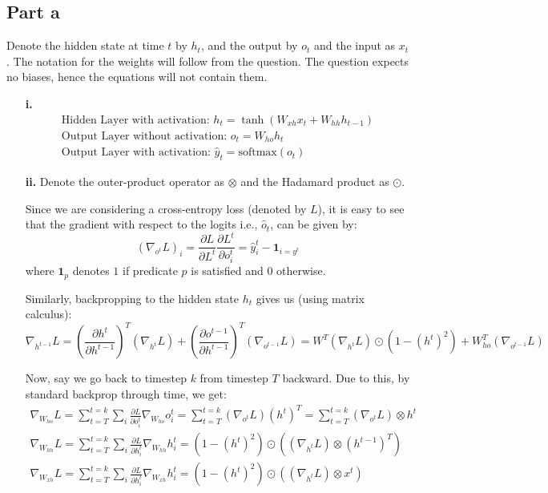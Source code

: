 \documentclass{article}
\newcommand{\Do}{\partial}
\newcommand{\G}{\nabla}
\begin{document}
\subsection*{Part a}
\begin{flushleft}
Denote the hidden state at time \(t\) by \(h_{t}\), and the output by \(o_{t}\) and the input as \(x_{t}\). The notation for the weights will follow from the question. The question expects no biases, hence the equations will not contain them.
\begin{itemize}
\item [\textbf{i.}]
\begin{gather}
\text{Hidden Layer with activation: }h_{t} = \tanh(W_{xh}x_{t} + W_{hh}h_{t-1}) \\
\text{Output Layer without activation: }o_{t} = W_{ho}h_{t} \\
\text{Output Layer with activation: }\hat{y}_{t} = \mathrm{softmax}(o_{t})
\end{gather}

\item [\textbf{ii.}]
Denote the outer-product operator as \(\otimes\) and the Hadamard product as \(\odot\).

Since we are considering a cross-entropy loss (denoted by \(L\)), it is easy to see that the gradient with respect to the logits i.e., \(\hat{o}_{t}\), can be given by:
\begin{equation}
\left(\G_{o^{t}} L\right)_{i} = \frac{\Do L}{\Do L^{t}} \frac{\Do L^{t}}{\Do o_{i}^{t}} = \hat{y}_{i}^{t} - \mathbf{1}_{i = y^{t}}
\end{equation}
where \(\mathbf{1}_{p}\) denotes \(1\) if predicate \(p\) is satisfied and \(0\) otherwise.

Similarly, backpropping to the hidden state \(h_{t}\) gives us (using matrix calculus):
\begin{equation}
\label{hidden}
\G_{h^{t - 1}} L = \left(\frac{\Do h^{t}}{\Do h^{t - 1}}\right)^{T} (\G_{h^{t}} L) + \left(\frac{\Do o^{t - 1}}{\Do h^{t - 1}}\right)^{T} (\G_{o^{t - 1}} L) = W^{T} (\G_{h^{t}} L) \odot (1 - (h^{t})^{2}) + W_{ho}^{T} (\G_{o^{t - 1}} L)
\end{equation}

Now, say we go back to timestep \(k\) from timestep \(T\) backward. Due to this, by standard backprop through time, we get:
\begin{gather}
\displaystyle \G_{W_{ho}} L = \sum_{t=T}^{t=k} \sum_{i} \frac{\Do L}{\Do o_{i}^{t}} \G_{W_{ho}} o_{i}^{t} = \sum_{t=T}^{t=k} (\G_{o^{t}} L) (h^{t})^{T} = \sum_{t=T}^{t=k} (\G_{o^{t}} L) \otimes h^{t} \\
\label{hidden-full}
\displaystyle \G_{W_{hh}} L = \sum_{t=T}^{t=k} \sum_{i} \frac{\Do L}{\Do h_{i}^{t}} \G_{W_{hh}} h_{i}^{t} = (1 - (h^{t})^{2}) \odot \left((\G_{h^{t}} L) \otimes (h^{t-1})^{T}\right) \\
\displaystyle \G_{W_{xh}} L = \sum_{t=T}^{t=k} \sum_{i} \frac{\Do L}{\Do h_{i}^{t}} \G_{W_{xh}} h_{i}^{t} = (1 - (h^{t})^{2}) \odot \left((\G_{h^{t}} L) \otimes x^{t}\right)
\end{gather}


\end{itemize}
\end{flushleft}
\end{document}

